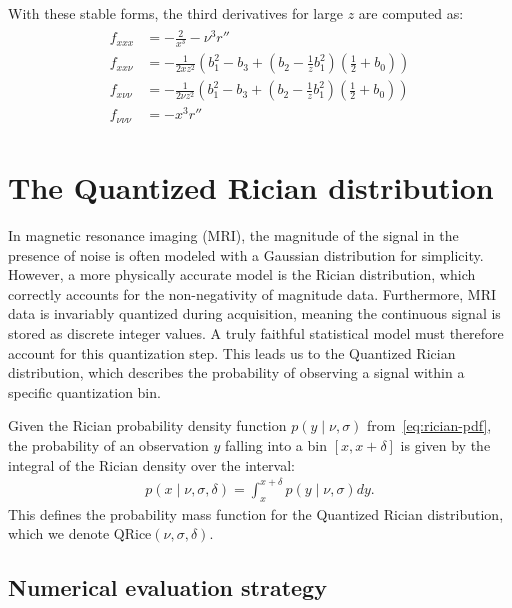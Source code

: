 \documentclass{article}
\begin{document}
With these stable forms, the third derivatives for large $z$ are computed as:
\begin{align}\label{eq:third-derivatives-large-z}
  \boxed{
    \begin{aligned}
      f_{xxx}       & = -\frac{2}{x^3} - \nu^3 r''                                                                       \\
      f_{xx\nu}     & = -\frac{1}{2 x z^2}   \left( b_1^2 - b_3 + (b_2  - \frac{1}{z} b_1^2) (\frac{1}{2} + b_0) \right) \\
      f_{x\nu\nu}   & = -\frac{1}{2 \nu z^2} \left( b_1^2 - b_3 + (b_2  - \frac{1}{z} b_1^2) (\frac{1}{2} + b_0) \right) \\
      f_{\nu\nu\nu} & = -x^3 r''
    \end{aligned}
  }
\end{align}

\section{The Quantized Rician distribution}

In magnetic resonance imaging (MRI), the magnitude of the signal in the presence of noise is often modeled with a Gaussian distribution for simplicity.
However, a more physically accurate model is the Rician distribution, which correctly accounts for the non-negativity of magnitude data.
Furthermore, MRI data is invariably quantized during acquisition, meaning the continuous signal is stored as discrete integer values.
A truly faithful statistical model must therefore account for this quantization step.
This leads us to the Quantized Rician distribution, which describes the probability of observing a signal within a specific quantization bin.

Given the Rician probability density function $p(y \mid \nu, \sigma)$ from~\eqref{eq:rician-pdf}, the probability of an observation $y$ falling into a bin $[x, x+\delta]$ is given by the integral of the Rician density over the interval:
%
\begin{align}\label{eq:quantized-rician-pdf}
  p(x \mid \nu, \sigma, \delta) = \int_x^{x+\delta} p(y \mid \nu, \sigma) dy.
\end{align}
%
This defines the probability mass function for the Quantized Rician distribution, which we denote $\mathrm{QRice}(\nu, \sigma, \delta)$.

\subsection{Numerical evaluation strategy}
\end{document}
